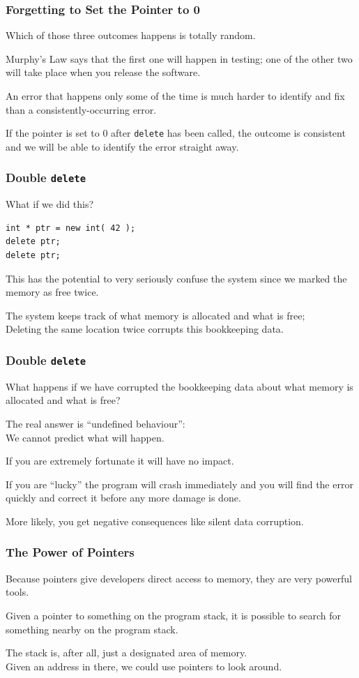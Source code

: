 \begin{frame}
\frametitle{Forgetting to Set the Pointer to 0}
Which of those three outcomes happens is totally random.

Murphy's Law says that the first one will happen in testing; one of the other two will take place when you release the software.

An error that happens only some of the time is much harder to identify and fix than a consistently-occurring error.

If the pointer is set to 0 after \texttt{delete} has been called, the outcome is consistent and we will be able to identify the error straight away.

\end{frame}

\begin{frame}[fragile]
\frametitle{Double \texttt{delete}}

What if we did this?

\begin{verbatim}
int * ptr = new int( 42 );
delete ptr;
delete ptr;
\end{verbatim}

This has the potential to very seriously confuse the system since we marked the memory as free twice.

The system keeps track of what memory is allocated and what is free;\\
\quad Deleting the same location twice corrupts this bookkeeping data.

\end{frame}

\begin{frame}
\frametitle{Double \texttt{delete}}
What happens if we have corrupted the bookkeeping data about what memory is allocated and what is free?

The real answer is ``undefined behaviour'': \\
\quad We cannot predict what will happen.

If you are extremely fortunate it will have no impact.

If you are ``lucky'' the program will crash immediately and you will find the error quickly and correct it before any more damage is done.

More likely, you get negative consequences like silent data corruption.

\end{frame}

\begin{frame}
\frametitle{The Power of Pointers}
Because pointers give developers direct access to memory, they are very powerful tools.

Given a pointer to something on the program stack, it is possible to search for something nearby on the program stack.

The stack is, after all, just a designated area of memory.\\
\quad Given an address in there, we could use pointers to look around.


\end{frame}

